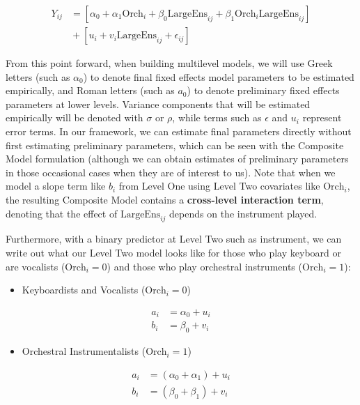 \documentclass[
]{krantz}
\providecommand{\tightlist}{%
  \setlength{\itemsep}{0pt}\setlength{\parskip}{0pt}}
\begin{document}
\begin{align*}
Y_{ij} & = [\alpha_{0}+\alpha_{1}\textrm{Orch}_{i}+\beta_{0}\textrm{LargeEns}_{ij}+\beta_{1}\textrm{Orch}_{i}\textrm{LargeEns}_{ij}] \\
 & \textrm{} + [u_{i}+v_{i}\textrm{LargeEns}_{ij}+\epsilon_{ij}]
\end{align*}

From this point forward, when building multilevel models, we will use Greek letters (such as \(\alpha_{0}\)) to denote final fixed effects model parameters to be estimated empirically, and Roman letters (such as \(a_{0}\)) to denote preliminary fixed effects parameters at lower levels. Variance components that will be estimated empirically will be denoted with \(\sigma\) or \(\rho\), while terms such as \(\epsilon\) and \(u_{i}\) represent error terms. In our framework, we can estimate final parameters directly without first estimating preliminary parameters, which can be seen with the Composite Model formulation (although we can obtain estimates of preliminary parameters in those occasional cases when they are of interest to us). Note that when we model a slope term like \(b_{i}\) from Level One using Level Two covariates like \(\textrm{Orch}_{i}\), the resulting Composite Model contains a \textbf{cross-level interaction term},  denoting that the effect of \(\textrm{LargeEns}_{ij}\) depends on the instrument played.

Furthermore, with a binary predictor at Level Two such as instrument, we can write out what our Level Two model looks like for those who play keyboard or are vocalists (\(\textrm{Orch}_{i}=0\)) and those who play orchestral instruments (\(\textrm{Orch}_{i}=1\)):

\begin{itemize}
\tightlist
\item
  Keyboardists and Vocalists (\(\textrm{Orch}_{i}=0\))
\end{itemize}

\begin{align*}
a_{i} & = \alpha_{0}+u_{i} \\
b_{i} & = \beta_{0}+v_{i}
\end{align*}

\begin{itemize}
\tightlist
\item
  Orchestral Instrumentalists (\(\textrm{Orch}_{i}=1\))
\end{itemize}

\begin{align*}
a_{i} & = (\alpha_{0}+\alpha_{1})+u_{i} \\
b_{i} & = (\beta_{0}+\beta_{1})+v_{i}
\label{eq:level2byorch}
\end{align*}
\end{document}
